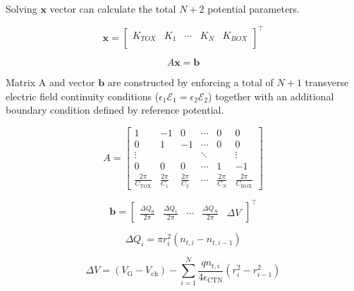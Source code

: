 \documentclass[journal,twoside,web]{ieeecolor}
\begin{document}
Solving $\mathbf{x}$ vector can calculate the total $N+2$ potential parameters.

\begin{equation}
\mathbf{x} = \begin{bmatrix}
K_{TOX} & K_1 & \cdots & K_N & K_{BOX} \\
\end{bmatrix} ^\top
\end{equation}

\begin{equation}
A\mathbf{x} = \mathbf{b}
\end{equation}

Matrix $\mathrm{A}$ and vector $\mathbf{b}$ are constructed by enforcing a total of $N+1$ transverse electric field continuity conditions ($\epsilon_1 \mathcal{E}_1 = \epsilon_2 \mathcal{E}_2$) together with an additional boundary condition defined by reference potential.

\begin{equation}
    \label{A}
A =
\begin{bmatrix}
1 & -1 & 0  & \cdots & 0 & 0 \\
0 & 1 & -1 & \cdots & 0 & 0 \\
\vdots & & & \ddots  & & \vdots \\
0 & 0 & 0 & \cdots & 1 & -1 \\
\frac{2\pi}{C_{\mathrm{TOX}}} & \frac{2\pi}{C_1} & \frac{2\pi}{C_2} &
\cdots & \frac{2\pi}{C_N} & \frac{2\pi}{C_{\mathrm{BOX}}}
\end{bmatrix}
\end{equation}


\begin{equation}
    \label{b}
\mathbf{b} =
\begin{bmatrix}
\frac{\Delta Q_0}{2\pi} &
\frac{\Delta Q_1}{2\pi} &
\cdots &
\frac{\Delta Q_N}{2\pi} &
\Delta V
\end{bmatrix} ^\top
\end{equation}

\begin{equation}
    \label{Delta Q}
    \Delta Q_i = \pi r_i^2\left(n_{t,i} - n_{t,i-1}\right)
\end{equation}

\begin{equation}
    \label{Delta V}
\Delta V = (V_\text{G} - V_\text{ch}) - \sum_{i=1}^{N} \frac{q n_{t,i}}{4 \epsilon_\mathrm{CTN}}\left(r_i^2 - r_{i-1}^2\right)
\end{equation}
\end{document}
